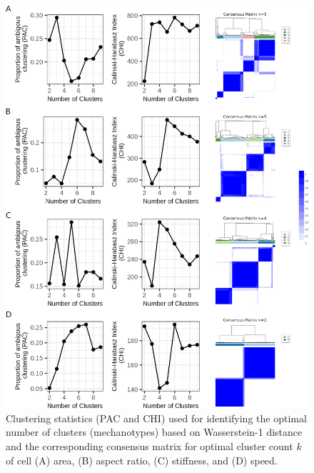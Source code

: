 \documentclass[11pt,letterpaper,english,oneside]{article} %
\begin{document}
\begin{figure}[H]
    \centering
    \includegraphics[scale=0.3]{../Figures/Supplementary_Figure7/supplementary_figure7.png} 
    \caption{Clustering statistics (PAC and CHI) used for identifying the optimal number of clusters (mechanotypes) based on Wasserstein-1 distance and the corresponding consensus matrix for optimal cluster count $k$
    of cell (A) area, (B) aspect ratio, (C) stiffness, and (D) speed.}
    \label{fig:fig7}
\end{figure}
\end{document}
